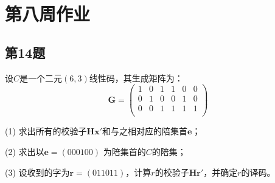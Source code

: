 \chapter{第八周作业}
\section{第14题}

设$C$是一个二元$(6,3)$线性码，其生成矩阵为：
\begin{equation}
    \bm{G} =
    \left(
            \begin{matrix}
                1 &0 &1 &1 &0 &0\\
                0 &1 &0 &0 &1 &0\\
                0 &0 &1 &1 &1 &1\\
            \end{matrix}
        \right)
\end{equation}

(1) 求出所有的校验子$\bm{Hx}'$和与之相对应的陪集首$\bm{e}$；

(2) 求出以$\bm{e} = (000100) $ 为陪集首的$C$的陪集；

(3) 设收到的字为$\bm{r}=(011011)$，计算$r$的校验子$\bm{Hr}'$，并确定$r$的译码。

